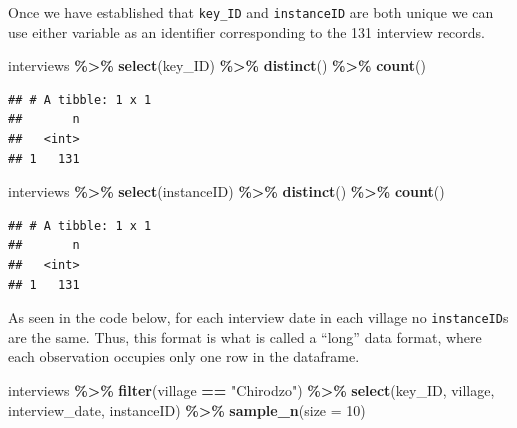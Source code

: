 \documentclass[
]{article}
\newenvironment{Shaded}{\begin{snugshade}}{\end{snugshade}}
\newcommand{\AttributeTok}[1]{\textcolor[rgb]{0.13,0.29,0.53}{#1}}
\newcommand{\DecValTok}[1]{\textcolor[rgb]{0.00,0.00,0.81}{#1}}
\newcommand{\FunctionTok}[1]{\textcolor[rgb]{0.13,0.29,0.53}{\textbf{#1}}}
\newcommand{\NormalTok}[1]{#1}
\newcommand{\SpecialCharTok}[1]{\textcolor[rgb]{0.81,0.36,0.00}{\textbf{#1}}}
\newcommand{\StringTok}[1]{\textcolor[rgb]{0.31,0.60,0.02}{#1}}
\begin{document}
Once we have established that \texttt{key\_ID} and \texttt{instanceID}
are both unique we can use either variable as an identifier
corresponding to the 131 interview records.

\begin{Shaded}
\begin{Highlighting}[]
\NormalTok{interviews }\SpecialCharTok{\%\textgreater{}\%} 
  \FunctionTok{select}\NormalTok{(key\_ID) }\SpecialCharTok{\%\textgreater{}\%} 
  \FunctionTok{distinct}\NormalTok{() }\SpecialCharTok{\%\textgreater{}\%} 
  \FunctionTok{count}\NormalTok{()}
\end{Highlighting}
\end{Shaded}

\begin{verbatim}
## # A tibble: 1 x 1
##       n
##   <int>
## 1   131
\end{verbatim}

\begin{Shaded}
\begin{Highlighting}[]
\NormalTok{interviews }\SpecialCharTok{\%\textgreater{}\%} 
  \FunctionTok{select}\NormalTok{(instanceID) }\SpecialCharTok{\%\textgreater{}\%} 
  \FunctionTok{distinct}\NormalTok{() }\SpecialCharTok{\%\textgreater{}\%} 
  \FunctionTok{count}\NormalTok{()}
\end{Highlighting}
\end{Shaded}

\begin{verbatim}
## # A tibble: 1 x 1
##       n
##   <int>
## 1   131
\end{verbatim}

As seen in the code below, for each interview date in each village no
\texttt{instanceID}s are the same. Thus, this format is what is called a
``long'' data format, where each observation occupies only one row in
the dataframe.

\begin{Shaded}
\begin{Highlighting}[]
\NormalTok{interviews }\SpecialCharTok{\%\textgreater{}\%}
  \FunctionTok{filter}\NormalTok{(village }\SpecialCharTok{==} \StringTok{"Chirodzo"}\NormalTok{) }\SpecialCharTok{\%\textgreater{}\%}
  \FunctionTok{select}\NormalTok{(key\_ID, village, interview\_date, instanceID) }\SpecialCharTok{\%\textgreater{}\%}
  \FunctionTok{sample\_n}\NormalTok{(}\AttributeTok{size =} \DecValTok{10}\NormalTok{)}
\end{Highlighting}
\end{Shaded}
\end{document}

